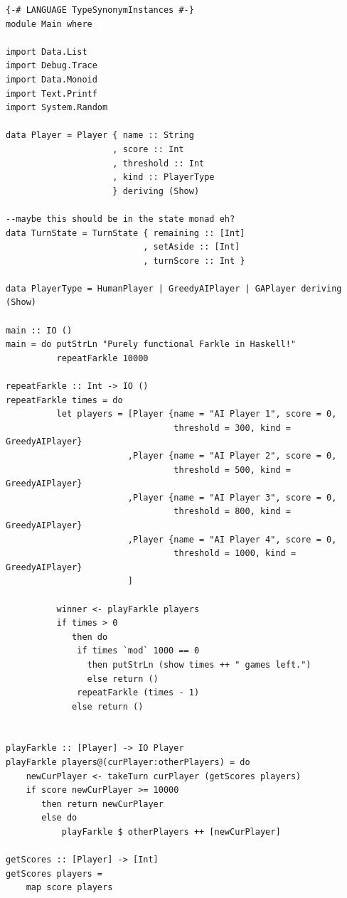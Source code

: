 \documentclass{article}
\begin{document}
\begin{lstlisting}
{-# LANGUAGE TypeSynonymInstances #-}
module Main where

import Data.List
import Debug.Trace
import Data.Monoid
import Text.Printf
import System.Random

data Player = Player { name :: String
                     , score :: Int
                     , threshold :: Int
                     , kind :: PlayerType
                     } deriving (Show)

--maybe this should be in the state monad eh?
data TurnState = TurnState { remaining :: [Int]
                           , setAside :: [Int]
                           , turnScore :: Int }

data PlayerType = HumanPlayer | GreedyAIPlayer | GAPlayer deriving (Show)

main :: IO ()
main = do putStrLn "Purely functional Farkle in Haskell!"
          repeatFarkle 10000

repeatFarkle :: Int -> IO ()
repeatFarkle times = do
          let players = [Player {name = "AI Player 1", score = 0,
                                 threshold = 300, kind = GreedyAIPlayer}
                        ,Player {name = "AI Player 2", score = 0,
                                 threshold = 500, kind = GreedyAIPlayer}
                        ,Player {name = "AI Player 3", score = 0,
                                 threshold = 800, kind = GreedyAIPlayer}
                        ,Player {name = "AI Player 4", score = 0,
                                 threshold = 1000, kind = GreedyAIPlayer}
                        ]

          winner <- playFarkle players
          if times > 0
             then do
              if times `mod` 1000 == 0
                then putStrLn (show times ++ " games left.")
                else return ()
              repeatFarkle (times - 1)
             else return ()


playFarkle :: [Player] -> IO Player
playFarkle players@(curPlayer:otherPlayers) = do
    newCurPlayer <- takeTurn curPlayer (getScores players)
    if score newCurPlayer >= 10000
       then return newCurPlayer
       else do
           playFarkle $ otherPlayers ++ [newCurPlayer]

getScores :: [Player] -> [Int]
getScores players =
    map score players


\end{lstlisting}
\end{document}
